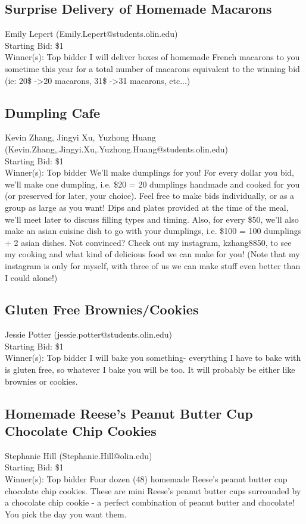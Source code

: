 \documentclass[11pt]{article}
\begin{document}
\subsection{Surprise Delivery of Homemade Macarons}
Emily Lepert (Emily.Lepert@students.olin.edu) \\
Starting Bid: \$1 \\
Winner(s): 
Top bidder\newline
I will deliver boxes of homemade French macarons to you sometime this year for a total number of macarons equivalent to the winning bid (ie: 20\$ -\textgreater  20 macarons, 31\$ -\textgreater  31 macarons, etc...)
\subsection{Dumpling Cafe}
Kevin Zhang, Jingyi Xu, Yuzhong Huang (Kevin.Zhang,.Jingyi.Xu,.Yuzhong.Huang@students.olin.edu) \\
Starting Bid: \$1 \\
Winner(s): 
Top bidder\newline
We'll make dumplings for you! For every dollar you bid, we'll make one dumpling, i.e. \$20 = 20 dumplings handmade and cooked for you (or preserved for later, your choice). Feel free to make bids individually, or as a group as large as you want! Dips and plates provided at the time of the meal, we'll meet later to discuss filling types and timing. Also, for every \$50, we'll also make an asian cuisine dish to go with your dumplings, i.e. \$100 = 100 dumplings + 2 asian dishes. Not convinced? Check out my instagram, kzhang8850, to see my cooking and what kind of delicious food we can make for you! (Note that my instagram is only for myself, with three of us we can make stuff even better than I could alone!)
\subsection{Gluten Free Brownies/Cookies}
Jessie Potter (jessie.potter@students.olin.edu) \\
Starting Bid: \$1 \\
Winner(s): 
Top bidder\newline
I will bake you something- everything I have to bake with is gluten free, so whatever I bake you will be too. It will probably be either like brownies or cookies.
\subsection{Homemade Reese's Peanut Butter Cup Chocolate Chip Cookies}
Stephanie Hill (Stephanie.Hill@olin.edu) \\
Starting Bid: \$1 \\
Winner(s): 
Top bidder\newline
Four dozen (48) homemade Reese's peanut butter cup chocolate chip cookies.  These are mini Reese's peanut butter cups surrounded by a chocolate chip cookie - a perfect combination of peanut butter and chocolate! You pick the day you want them.
\end{document}

